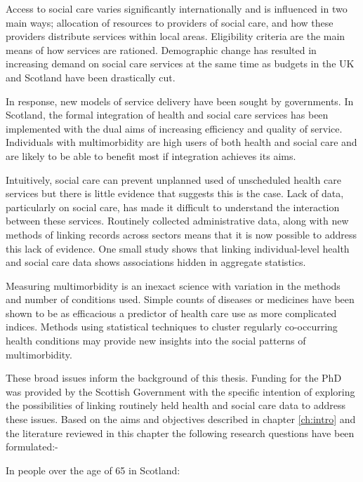 \documentclass[12pt,]{report}
\begin{document}
Access to social care varies significantly internationally and is
influenced in two main ways; allocation of resources to providers of
social care, and how these providers distribute services within local
areas. Eligibility criteria are the main means of how services are
rationed. Demographic change has resulted in increasing demand on social
care services at the same time as budgets in the UK and Scotland have
been drastically cut.

In response, new models of service delivery have been sought by
governments. In Scotland, the formal integration of health and social
care services has been implemented with the dual aims of increasing
efficiency and quality of service. Individuals with multimorbidity are
high users of both health and social care and are likely to be able to
benefit most if integration achieves its aims.

Intuitively, social care can prevent unplanned used of unscheduled
health care services but there is little evidence that suggests this is
the case. Lack of data, particularly on social care, has made it
difficult to understand the interaction between these services.
Routinely collected administrative data, along with new methods of
linking records across sectors means that it is now possible to address
this lack of evidence. One small study \citep{RN462} shows that linking
individual-level health and social care data shows associations hidden
in aggregate statistics.

Measuring multimorbidity is an inexact science with variation in the
methods and number of conditions used. Simple counts of diseases or
medicines have been shown to be as efficacious a predictor of health
care use as more complicated indices. Methods using statistical
techniques to cluster regularly co-occurring health conditions may
provide new insights into the social patterns of multimorbidity.

These broad issues inform the background of this thesis. Funding for the
PhD was provided by the Scottish Government with the specific intention
of exploring the possibilities of linking routinely held health and
social care data to address these issues. Based on the aims and
objectives described in chapter \ref{ch:intro} and the literature
reviewed in this chapter the following research questions have been
formulated:-

In people over the age of 65 in Scotland:
\end{document}
